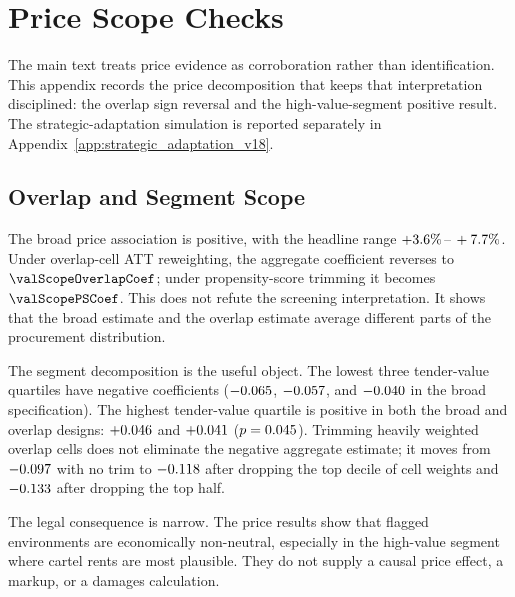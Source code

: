 \section{Price Scope Checks}
\label{app:scope_adaptation_v18}

The main text treats price evidence as corroboration rather
than identification. This appendix records the price
decomposition that keeps that interpretation disciplined: the
overlap sign reversal and the high-value-segment positive
result. The strategic-adaptation simulation is reported
separately in Appendix~\ref{app:strategic_adaptation_v18}.

\subsection{Overlap and Segment Scope}
\label{app:overlap_scope_v18}

The broad price association is positive, with the headline range
$+3.6\%\,\text{--}\,+7.7\%$. Under overlap-cell ATT reweighting, the
aggregate coefficient reverses to $\valScopeOverlapCoef$; under
propensity-score trimming it becomes $\valScopePSCoef$. This
does not refute the screening interpretation. It shows that the
broad estimate and the overlap estimate average different parts
of the procurement distribution.

The segment decomposition is the useful object. The lowest three
tender-value quartiles have negative coefficients
($-0.065$, $-0.057$, and
$-0.040$ in the broad specification). The highest
tender-value quartile is positive in both the broad and overlap
designs: $+0.046$ and $+0.041$
($p=0.045$). Trimming heavily weighted overlap cells
does not eliminate the negative aggregate estimate; it moves from
$-0.097$ with no trim to $-0.118$ after dropping
the top decile of cell weights and $-0.133$ after
dropping the top half.

The legal consequence is narrow. The price results show that
flagged environments are economically non-neutral, especially in
the high-value segment where cartel rents are most plausible.
They do not supply a causal price effect, a markup, or a damages
calculation.
